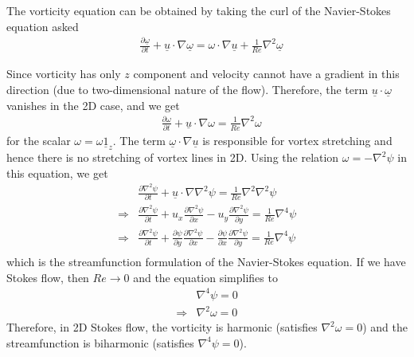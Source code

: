 \documentclass[11pt,a4paper]{article}
\newcommand{\pd}[2]{\frac{\partial #1}{\partial #2}}
\newcommand{\vect}[1]{\underline{#1}}
\newcommand{\1}{\vect{1}}
\newcommand{\grad}{\nabla}
\newcommand{\RA}{\Rightarrow}
\newcommand{\vu}{\vect{u}}
\begin{document}
The vorticity equation can be obtained by taking the curl of the Navier-Stokes equation asked
\begin{align*}
&\pd{\vect \omega}{t} + \vu\cdot\grad\vect\omega = \omega\cdot\grad\vu + \frac{1}{Re}\grad^2\vect\omega
\end{align*}

Since vorticity has only $z$ component and velocity cannot have a gradient in this direction (due to two-dimensional nature of the flow). Therefore, the term $\vect u\cdot\vect\omega$ vanishes in the 2D case, and we get
\begin{align*}
&\pd{\omega}{t} + \vu\cdot\grad\omega = \frac{1}{Re}\grad^2\omega
\end{align*}
for the scalar $\omega = \omega\1_z$. The term $\vect\omega\cdot\grad\vu$ is responsible for vortex stretching and hence there is no stretching of vortex lines in 2D. Using the relation $\omega = -\grad^2\psi$ in this equation, we get
\begin{align*}
&\pd{\grad^2\psi}{t} + \vu\cdot\grad\grad^2\psi = \frac{1}{Re}\grad^2\grad^2\psi\\
\RA &\pd{\grad^2\psi}{t} + u_x\pd{\grad^2\psi}{x} - u_y\pd{\grad^2\psi}{y} = \frac{1}{Re}\grad^4\psi\\
\RA &\pd{\grad^2\psi}{t} + \pd{\psi}{y}\pd{\grad^2\psi}{x} - \pd{\psi}{x}\pd{\grad^2\psi}{y} = \frac{1}{Re}\grad^4\psi\\
\end{align*}
which is the streamfunction formulation of the Navier-Stokes equation. If we have Stokes flow, then $Re\to 0$ and the equation simplifies to\begin{align*}
&\grad^4\psi = 0\\
\RA& \grad^2\omega = 0
\end{align*}
Therefore, in 2D Stokes flow, the vorticity is harmonic (satisfies $\grad^2\omega = 0$) and the streamfunction is biharmonic (satisfies $\grad^4\psi = 0$).
\end{document}
